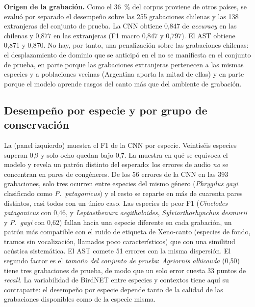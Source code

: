 

\textbf{Origen de la grabación.} Como el \SI{36}{\percent} del corpus
proviene de otros países, se evaluó por separado el desempeño sobre las 255
grabaciones chilenas y las 138 extranjeras del conjunto de prueba. La CNN
obtiene 0,847 de \textit{accuracy} en las chilenas y 0,877 en las
extranjeras (F1 macro 0,847 y 0,797). El AST obtiene 0,871 y 0,870. No hay,
por tanto, una penalización sobre las grabaciones chilenas: el desplazamiento de
dominio que se anticipó en el  no se manifiesta en el
conjunto de prueba, en parte porque las grabaciones extranjeras pertenecen a
las mismas especies y a poblaciones vecinas (Argentina aporta la mitad de
ellas) y en parte porque el modelo aprende rasgos del canto más que del
ambiente de grabación.

\subsection{Desempeño por especie y por grupo de conservación}

La  (panel izquierdo) muestra el F1 de la CNN por
especie. Veintiséis especies superan 0,9 y solo ocho quedan bajo 0,7. La
 muestra en qué se equivoca el modelo y revela un
patrón distinto del esperado: los errores de audio \emph{no} se concentran
en pares de congéneres. De los 56 errores de la CNN en las 393 grabaciones,
solo tres ocurren entre especies del mismo género (\textit{Phrygilus gayi}
clasificado como \textit{P.~patagonicus}) y el resto se reparte en más de
cuarenta pares distintos, casi todos con un único caso. Las especies de peor
F1 (\textit{Cinclodes patagonicus} con 0,46, y \textit{Leptasthenura
aegithaloides}, \textit{Sylviorthorhynchus desmurii} y \textit{P.~gayi} con
0,62) fallan hacia una especie diferente en cada grabación, un patrón más
compatible con el ruido de etiqueta de Xeno-canto (especies de fondo, tramos
sin vocalización, llamados poco característicos) que con una similitud
acústica sistemática. El AST comete 51 errores con la misma dispersión. El
segundo factor es el \emph{tamaño del conjunto de prueba}: \textit{Agriornis
albicauda} (0,50) tiene tres grabaciones de prueba, de modo que un solo error
cuesta 33 puntos de \textit{recall}. La variabilidad de BirdNET entre
especies y contextos \citep{perezgranados2023birdnet} tiene aquí su
contraparte: el desempeño por especie depende tanto de la calidad de las
grabaciones disponibles como de la especie misma.

